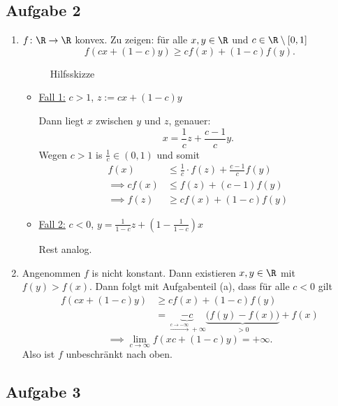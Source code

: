 \subsection*{Aufgabe 2}
\label{sec:Aufgabe 2}
\begin{enumerate}[label=(\alph{enumi})]
	\item $f \colon \R \rightarrow \R $ konvex. Zu zeigen: für alle $x,y \in \R$ und $c \in \R \setminus [0,1]$
		\[
			f(cx + (1-c)y) \geq cf(x) + (1-c)f(y)
		.\] 
		\begin{figure}[H]
			\begin{center}
				
			\end{center}
			\caption{Hilfsskizze}
			\label{fig:Skizze1}
		\end{figure}
		
		\begin{itemize}
			\item \underline{Fall 1:} $c>1$, $z:=cx + (1-c)y$

				Dann liegt $x$ zwischen $y$ und $z$, genauer:
				\[
				x=\frac{1}{c}z + \frac{c-1}{c}y
				.\] 
				Wegen $c>1$ is $\frac{1}{c} \in (0,1)$ und somit
				\begin{align*}
					f(x) &\leq \frac{1}{c} \cdot f(z) + \frac{c-1}{c}f(y) \\
					\implies c f(x) &\leq f(z) + (c-1) f(y) \\
					\implies f(z) &\geq cf(x) + (1-c) f(y)
				\end{align*}
			\item \underline{Fall 2:} $c<0$, $y=\frac{1}{1-c}z + (1-\frac{1}{1-c})x$

				Rest analog.
		\end{itemize}

	\item Angenommen $f$ is nicht konstant. Dann existieren $x,y \in \R$ mit $f(y) > f(x)$. Dann folgt mit Aufgabenteil (a), dass für alle $c<0$ gilt
		\begin{align*}
			f(cx + (1-c) y) &\geq cf(x) + (1-c) f(y) \\
							&= \underbrace{-c}_{\overset{c \rightarrow - \infty}{\longrightarrow} + \infty} \underbrace{\Big( f(y) -f(x) \Big)}_{>0}  + f(x)
		\end{align*}
		\[
			\implies \lim_{c \rightarrow \infty} f(xc + (1-c)y) = +\infty
		.\] 
		Also ist $f$ unbeschränkt nach oben.
\end{enumerate}

\subsection*{Aufgabe 3}
\label{sec:Aufgabe 3}

